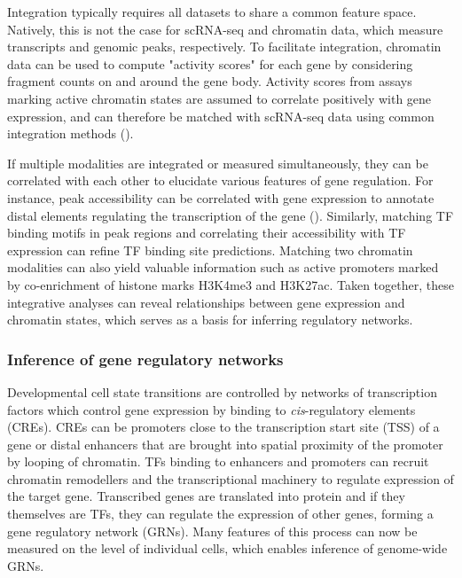 Integration typically requires all datasets to share a common feature space. Natively, this is not the case for scRNA-seq and chromatin data, which measure transcripts and genomic peaks, respectively. To facilitate integration, chromatin data can be used to compute "activity scores" for each gene by considering fragment counts on and around the gene body. Activity scores from assays marking active chromatin states are assumed to correlate positively with gene expression, and can therefore be matched with scRNA-seq data using common integration methods (\cite{stuart_comprehensive_2019,luecken_benchmarking_2022}). 

If multiple modalities are integrated or measured simultaneously, they can be correlated with each other to elucidate various features of gene regulation. For instance, peak accessibility can be correlated with gene expression to annotate distal elements regulating the transcription of the gene (\cite{ma_chromatin_2020}). Similarly, matching TF binding motifs in peak regions and correlating their accessibility with TF expression can refine TF binding site predictions. Matching two chromatin modalities can also yield valuable information such as active promoters marked by co-enrichment of histone marks H3K4me3 and H3K27ac. Taken together, these integrative analyses can reveal relationships between gene expression and chromatin states, which serves as a basis for inferring regulatory networks.



\subsubsection{Inference of gene regulatory networks}

Developmental cell state transitions are controlled by networks of transcription factors which control gene expression by binding to \textit{cis}-regulatory elements (CREs). CREs can be promoters close to the transcription start site (TSS) of a gene or distal enhancers that are brought into spatial proximity of the promoter by looping of chromatin. TFs binding to enhancers and promoters can recruit chromatin remodellers and the transcriptional machinery to regulate expression of the target gene. Transcribed genes are translated into protein and if they themselves are TFs, they can regulate the expression of other genes, forming a gene regulatory network (GRNs). Many features of this process can now be measured on the level of individual cells, which enables inference of genome-wide GRNs.

